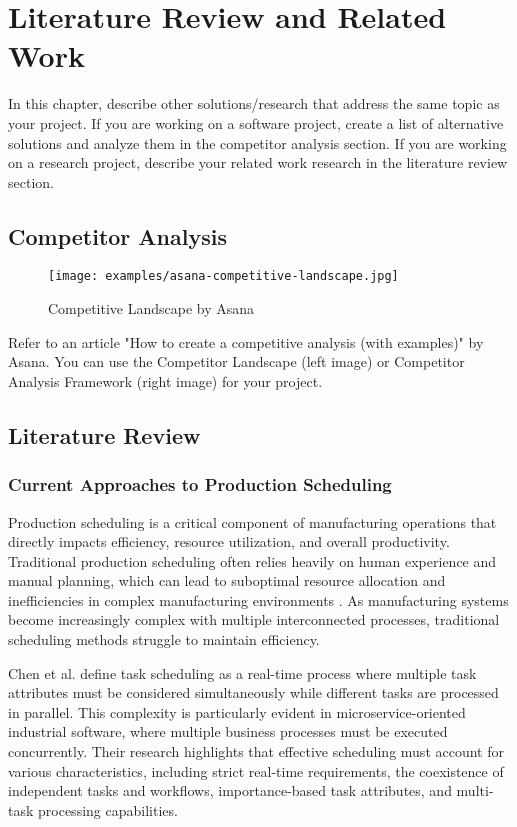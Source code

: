 \chapter{Literature Review and Related Work}
\label{chap:relatedworks}

In this chapter, describe other solutions/research that address the
same topic as your project. If you are working on a software project, create a
list of alternative solutions and analyze them in the competitor analysis section.
If you are working on a research project, describe your related work research in
the literature review section.

\section{Competitor Analysis}
\label{section:competitor-analysis}

\begin{figure}[h]
    \centering
    \texttt{[image: examples/asana-competitive-landscape.jpg]}
    \caption{Competitive Landscape by Asana}
\end{figure}

Refer to an article "How to create a competitive analysis (with
examples)" by Asana. You can use the Competitor Landscape (left image) or
Competitor Analysis Framework (right image) for your project.

\section{Literature Review}
\label{section:literature-review}


\subsection{Current Approaches to Production Scheduling}

Production scheduling is a critical component of manufacturing operations that directly impacts efficiency, resource utilization, and overall productivity. Traditional production scheduling often relies heavily on human experience and manual planning, which can lead to suboptimal resource allocation and inefficiencies in complex manufacturing environments \cite{alander2024}. As manufacturing systems become increasingly complex with multiple interconnected processes, traditional scheduling methods struggle to maintain efficiency.

Chen et al. \cite{chen2023} define task scheduling as a real-time process where multiple task attributes must be considered simultaneously while different tasks are processed in parallel. This complexity is particularly evident in microservice-oriented industrial software, where multiple business processes must be executed concurrently. Their research highlights that effective scheduling must account for various characteristics, including strict real-time requirements, the coexistence of independent tasks and workflows, importance-based task attributes, and multi-task processing capabilities.

